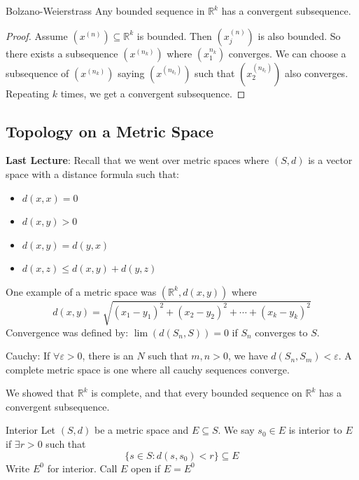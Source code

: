 \documentclass{report}
\begin{document}
\begin{theorem}{Bolzano-Weierstrass}
    Any bounded sequence in $\mathbb{R}^{k}$ has a convergent subsequence.
\end{theorem}
    \begin{proof}
        Assume $(x^{(n)}) \subseteq \mathbb{R}^{k}$  is bounded. Then $(x_{j}^{(n)})$ is also bounded. So there exists a subsequence $(x^{(n_{k})})$ where $(x_{1}^{n_{k}})$ converges. We can choose a subsequence of $(x^{(n_{k})})$ saying $(x^{(n_{k_{l}})})$ such that $(x_{2}^{(n_{k_{l}})})$ also converges. Repeating $k$ times, we get a convergent subsequence.
    \end{proof}

\begin{topic}
    \section{Topology on a Metric Space}
\end{topic}

\textbf{Last Lecture}: Recall that we went over metric spaces where $(S, d)$ is a vector space with a distance formula such that:
    \begin{itemize}
        \item $d(x, x) = 0$

        \item $d(x, y) > 0$

        \item $d(x, y) = d(y, x)$

        \item $d(x, z) \leq d(x, y) + d(y, z)$ 
    \end{itemize}
One example of a metric space was $(\mathbb{R}^{k}, d(x, y))$ where 
    \begin{equation*}
        d(x, y) = \sqrt{(x_{1} - y_{1})^{2} + (x_{2} - y_{2})^{2} + \cdots  + (x_{k} - y_{k})^{2}}
    \end{equation*}
Convergence was defined by: $\lim(d(S_{n}, S)) = 0$ if $S_{n}$ converges to $S$.

Cauchy: If $\forall \varepsilon> 0$, there is an $N$ such that $m, n> 0$, we have $d(S_{n}, S_{m}) < \varepsilon$. A complete metric space is one where all cauchy sequences converge.

We showed that $\mathbb{R}^{k}$ is complete, and that every bounded sequence on $\mathbb{R}^{k}$ has a convergent subsequence.

\begin{definition}{Interior}
    Let $(S, d)$ be a metric space and $E \subseteq S$. We say $s_{0} \in E$ is interior to $E$ if $\exists r > 0$ such that 
        \begin{equation*}
            \{s \in S : d(s, s_{0}) < r\} \subseteq E
        \end{equation*}
    Write $E^{0}$ for interior. Call $E$ open if $E = E^{0}$
\end{definition}
\end{document}
